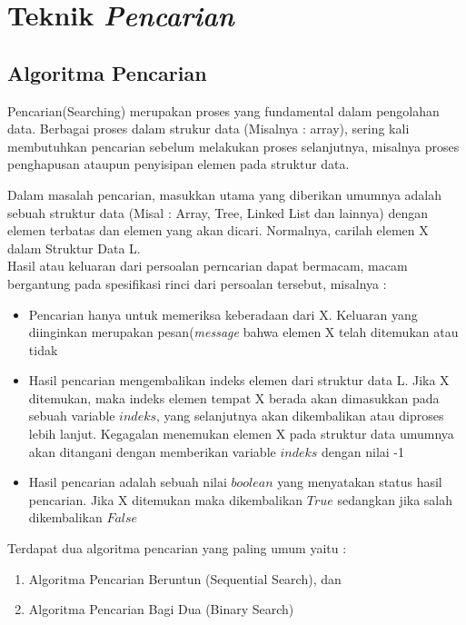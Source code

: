 \chapter{Teknik \textit{Pencarian}}\label{ch:modul4}

\section{Algoritma Pencarian}
Pencarian(Searching) merupakan proses yang fundamental dalam pengolahan data. Berbagai proses dalam strukur data (Misalnya : array), sering kali membutuhkan pencarian sebelum melakukan proses selanjutnya, misalnya proses penghapusan ataupun penyisipan elemen pada struktur data. 

Dalam masalah pencarian, masukkan utama yang diberikan umumnya adalah sebuah struktur data (Misal : Array, Tree, Linked List dan lainnya) dengan elemen terbatas dan elemen yang akan dicari. Normalnya, carilah elemen X dalam Struktur Data L.\\

Hasil atau keluaran dari persoalan perncarian dapat bermacam, macam bergantung pada spesifikasi rinci dari persoalan tersebut, misalnya  : \\
\begin{itemize}
\item{Pencarian hanya untuk memeriksa keberadaan dari X. Keluaran yang diinginkan merupakan pesan(\textit{message} bahwa elemen X telah ditemukan atau tidak}
\item{Hasil pencarian mengembalikan indeks elemen dari struktur data L. Jika X ditemukan, maka indeks elemen tempat X berada akan dimasukkan pada sebuah variable $indeks$, yang selanjutnya akan dikembalikan atau diproses lebih lanjut. Kegagalan menemukan elemen X pada struktur data umumnya akan ditangani dengan memberikan variable $indeks$ dengan nilai -1}
\item{Hasil pencarian adalah sebuah nilai $boolean$ yang menyatakan status hasil pencarian. Jika X ditemukan maka dikembalikan $True$ sedangkan jika salah dikembalikan $False$}
\end{itemize}
Terdapat dua algoritma pencarian yang paling umum yaitu : 
\begin{enumerate}
\item{Algoritma Pencarian Beruntun (Sequential Search), dan}
\item{Algoritma Pencarian Bagi Dua (Binary Search)}
\end{enumerate}

